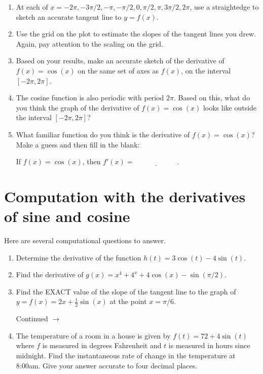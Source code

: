 \documentclass[11pt]{article}
\def\ra{\rightarrow}
\def\pageturn{\vfill 
\begin{flushright}
	\begin{small}
		Continued $\ra$
	\end{small}
\end{flushright} \newpage}
\begin{document}
\begin{enumerate}
	\item At each of $x = -2\pi, -3 \pi/2, -\pi, -\pi/2, 0, \pi/2, \pi, 3\pi/2, 2\pi$, use a straightedge to sketch an accurate tangent line to $y = f(x)$. 
	\item Use the grid on the plot to estimate the slopes of the tangent lines you drew. Again, pay attention to the scaling on the grid. 
	\item Based on your results, make an accurate sketch of the derivative of $f(x) = \cos(x)$ on the same set of axes as $f(x)$, on the interval $[-2\pi, 2\pi]$. 
	\item The cosine function is also periodic with period $2 \pi$. Based on this, what do you think the graph of the derivative of $f(x) = \cos(x)$ looks like outside the interval $[-2\pi, 2\pi]$? 
	
	\vspace{0.5in}
	
	\item What familiar function do you think is the derivative of $f(x) = \cos(x)$? Make a guess and then fill in the blank: 
	\begin{center}
		If $f(x) = \cos(x)$, then $f'(x) = \underline{\hspace{1in}}$. 
	\end{center}
	
\end{enumerate}



\section{Computation with the derivatives of sine and cosine}

Here are several computational questions to answer.

\begin{enumerate}
	\item Determine the derivative of the function $h(t) = 3 \cos(t) - 4 \sin(t)$. 
	
	\vspace{1in}
	
	\item Find the derivative of $g(x) = x^4 + 4^x + 4 \cos(x) - \sin(\pi/2)$. 
	
	\vspace{1in}
	
	\item Find the EXACT value of the slope of the tangent line to the graph of $y= f(x) = 2x + \frac{1}{2} \sin(x)$ at the point $x = \pi/6$. 
	
\pageturn
	
	\item The temperature of a room in a house is given by $f(t) = 72 + 4 \sin(t)$ where $f$ is measured in degrees Fahrenheit and $t$ is measured in hours since midnight. Find the instantaneous rate of change in the temperature at 8:00am. Give your answer accurate to four decimal places. 
	
	\vspace{1in}
	
\end{enumerate}
\end{document}
